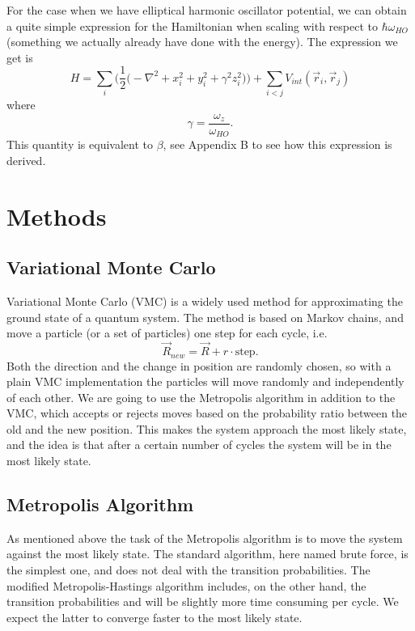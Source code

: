 \documentclass[norsk,a4paper,12pt]{article}
\begin{document}
For the case when we have elliptical harmonic oscillator potential, we can obtain a quite simple expression for the Hamiltonian when scaling with respect to $\hbar\omega_{HO}$ (something we actually already have done with the energy). The expression we get is
\begin{equation}
H=\sum_i\bigg(\frac{1}{2}\Big(-\nabla^2 + x_i^2 + y_i^2 + \gamma^2z_i^2\Big)\bigg)+\sum_{i<j}V_{int}(\vec{r}_i,\vec{r}_j)
\end{equation}
where
\begin{equation*}
\gamma=\frac{\omega_z}{\omega_{HO}}.
\end{equation*}
This quantity is equivalent to $\beta$, see Appendix B to see how this expression is derived. 

\section{Methods}
\subsection{Variational Monte Carlo}\label{VMC}
Variational Monte Carlo (VMC) is a widely used method for approximating the ground state of a quantum system. The method is based on Markov chains, and move a particle (or a set of particles) one step for each cycle, i.e.
\begin{equation}
\vec{R}_{new} = \vec{R} + r\cdot \text{step}.
\end{equation}
Both the direction and the change in position are randomly chosen, so with a plain VMC implementation the particles will move randomly and independently of each other. We are going to use the Metropolis algorithm in addition to the VMC, which accepts or rejects moves based on the probability ratio between the old and the new position. This makes the system approach the most likely state, and the idea is that after a certain number of cycles the system will be in the most likely state. 

\subsection{Metropolis Algorithm}
As mentioned above the task of the Metropolis algorithm is to move the system against the most likely state. The standard algorithm, here named brute force, is the simplest one, and does not deal with the transition probabilities. The modified Metropolis-Hastings algorithm includes, on the other hand, the transition probabilities and will be slightly more time consuming per cycle. We expect the latter to converge faster to the most likely state. 
\end{document}
